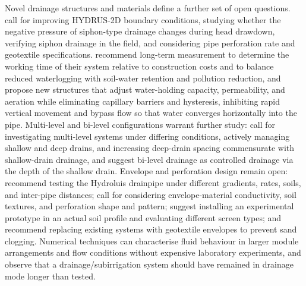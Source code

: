 Novel drainage structures and materials define a further set of open
questions. \textcite{Ren2023} call for improving HYDRUS-2D boundary
conditions, studying whether the negative pressure of siphon-type drainage
changes during head drawdown, verifying siphon drainage in the field, and
considering pipe perforation rate and geotextile specifications.
\textcite{Tao2025b} recommend long-term measurement to determine the working
time of their system relative to construction costs and to balance reduced
waterlogging with soil-water retention and pollution reduction, and
\textcite{Li2021} propose new structures that adjust water-holding capacity,
permeability, and aeration while eliminating capillary barriers and hysteresis,
inhibiting rapid vertical movement and bypass flow so that water converges
horizontally into the pipe. Multi-level and bi-level configurations warrant
further study: \textcite{Hornbuckle2007} call for investigating multi-level
systems under differing conditions, actively managing shallow and deep drains,
and increasing deep-drain spacing commensurate with shallow-drain drainage,
and \textcite{Verma1998} suggest bi-level drainage as controlled drainage via
the depth of the shallow drain. Envelope and perforation design remain open:
\textcite{Alavi2021} recommend testing the Hydroluis drainpipe under different
gradients, rates, soils, and inter-pipe distances; \textcite{Wu2022} call for
considering envelope-material conductivity, soil textures, and perforation
shape and pattern; \textcite{Oyarce2017} suggest installing an experimental
prototype in an actual soil profile and evaluating different screen types; and
\textcite{HajAmor2019} recommend replacing existing systems with geotextile
envelopes to prevent sand clogging. Numerical techniques can characterise fluid behaviour in larger module
arrangements and flow conditions without expensive laboratory experiments, and
\textcite{Nelson2011b} observe that a drainage/subirrigation system should have
remained in drainage mode longer than tested.

